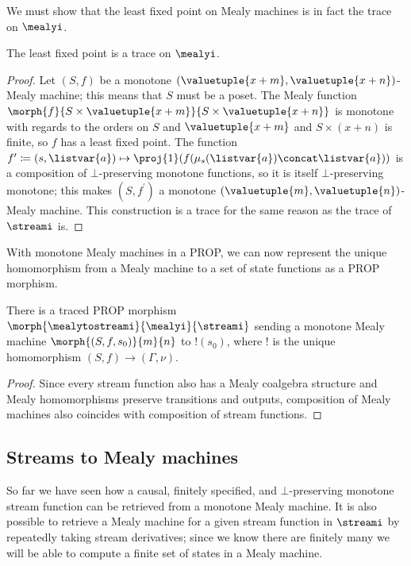 \documentclass{lmcs}
\begin{document}
We must show that the least fixed point on Mealy machines is in fact the trace
on \(\mealyi\).

\begin{prop}
    The least fixed point is a trace on \(\mealyi\).
\end{prop}
\begin{proof}
    Let \((S, f)\) be a monotone
    \((\valuetuple{x+m}, \valuetuple{x+n})\)-Mealy machine; this means that
    \(S\) must be a poset.
    The Mealy function \(
    \morph{f}{
        S \times \valuetuple{x+m}
    }{
        S \times \valuetuple{x+n}
    }
    \) is monotone with regards to the orders on \(S\) and
    \(\valuetuple{x+m}\) and \(S \times (x+n)\) is finite, so
    \(f\) has a least fixed point.
    The function \(
    f^\prime \coloneqq (s, \listvar{a})
    \mapsto
    \proj{1}\mleft(f(\mu_{s}(\listvar{a}) \concat \listvar{a})\mright)
    \) is a composition of \(\bot\)-preserving monotone functions, so it is
    itself \(\bot\)-preserving monotone; this makes \((S, f^\prime)\) a monotone
    \((\valuetuple{m}, \valuetuple{n})\)-Mealy machine.
    This construction is a trace for the same reason as the trace of
    \(\streami\) is.
\end{proof}

With monotone Mealy machines in a PROP, we can now represent the unique
homomorphism from a Mealy machine to a set of state functions as a PROP
morphism.

\begin{prop}\label{prop:mealy-to-stream}
    There is a traced PROP morphism
    \(\morph{\mealytostreami}{\mealyi}{\streami}\) sending a monotone Mealy
    machine \(\morph{\left(S, f, s_0\right)}{m}{n}\) to \(!(s_0)\), where \(!\)
    is the unique homomorphism \((S,f) \to (\Gamma,\nu)\).
\end{prop}
\begin{proof}
    Since every stream function also has a Mealy coalgebra structure and Mealy
    homomorphisms preserve transitions and outputs,
    composition of Mealy machines also coincides with composition of stream
    functions.
\end{proof}

\subsection{Streams to Mealy machines}

So far we have seen how a causal, finitely specified, and \(\bot\)-preserving
monotone stream function can be retrieved from a monotone Mealy machine.
It is also possible to retrieve a Mealy machine for a given stream function in
\(\streami\) by repeatedly taking stream derivatives; since we know there are
finitely many we will be able to compute a finite set of states in a Mealy
machine.
\end{document}
